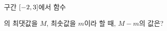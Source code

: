 구간 $[-2{,}\mkern3mu\mathopen{}3]$에서 함수\par\smallskip{}\par\smallskip\noindent 의 최댓값을 $M$, 최솟값을 $m$이라 할 때, $M-m$의 값은?
